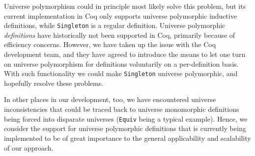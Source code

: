 \documentclass[a4paper,10pt,runningheads]{llncs}
\begin{document}
Universe polymorphism could in principle most likely solve this problem, but its current implementation in Coq only supports universe polymorphic inductive definitions, while \lstinline|Singleton| is a regular definition. Universe polymorphic \emph{definitions} have historically not been supported in Coq, primarily because of efficiency concerns. However, we have taken up the issue with the Coq development team, and they have agreed to introduce the means to let one turn on universe polymorphism for definitions voluntarily on a per-definition basis. With such functionality we could make \lstinline|Singleton| universe polymorphic, and hopefully resolve these problems.

In other places in our development, too, we have encountered universe inconsistencies that could be traced back to universe monomorphic definitions being forced into disparate universes (\lstinline|Equiv| being a typical example). Hence, we consider the support for universe polymorphic definitions that is currently being implemented to be of great importance to the general applicability and scalability of our approach.


\begin{comment}
Canonical structures have been used to provide a uniform treatment~\cite{bertot2008canonical} of big
operators, like $\Pi,\Sigma, \max$. These operators extend a pair of a binary and a 0-ary operation
to an $n$-ary operation for any $n$. Categorically, one considers the algebra maps from non-empty
lists, lists, inhabited finite sets and finite sets to the carrier of a semigroup, monoid,
commutative semigroup, commutative monoid. Hence we want to reuse the libraries for lists etc.\ as much as possible.

Again, we can use type classes, instead of canonical structures, to deduce the relevant monoid operation:
\begin{lstlisting}
  Definition seq_sum
    `{Sequence A T} `{RingPlus A} `{z: RingZero A}: T $\to$ A
    := @seq_to_monoid A T _ A ring_plus z id.
  Eval compute in seq_sum [3; 2].
\end{lstlisting}
\end{comment}
\end{document}
